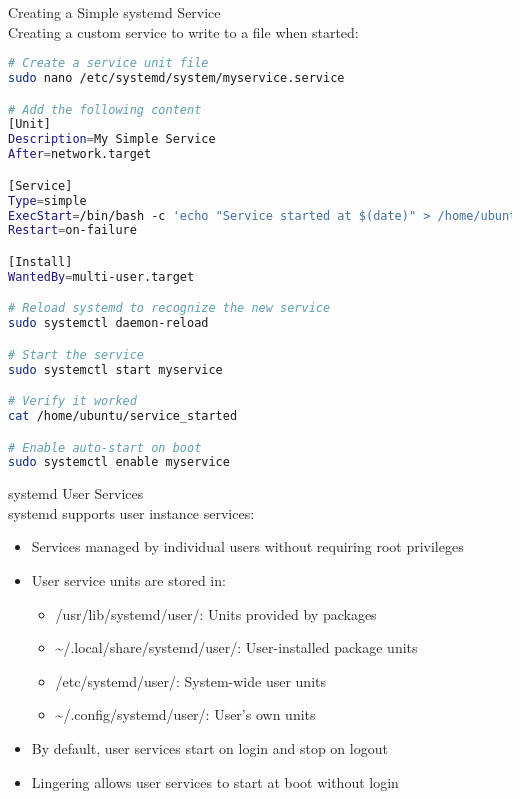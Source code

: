 \begin{example2}{Creating a Simple systemd Service}\\
    Creating a custom service to write to a file when started:
    
\begin{lstlisting}[language=bash, style=basesmol]
# Create a service unit file
sudo nano /etc/systemd/system/myservice.service

# Add the following content
[Unit]
Description=My Simple Service
After=network.target

[Service]
Type=simple
ExecStart=/bin/bash -c 'echo "Service started at $(date)" > /home/ubuntu/service_started'
Restart=on-failure

[Install]
WantedBy=multi-user.target

# Reload systemd to recognize the new service
sudo systemctl daemon-reload

# Start the service
sudo systemctl start myservice

# Verify it worked
cat /home/ubuntu/service_started

# Enable auto-start on boot
sudo systemctl enable myservice
\end{lstlisting}
\end{example2}

\begin{definition}{systemd User Services}\\
    systemd supports user instance services:
    \begin{itemize}
        \item Services managed by individual users without requiring root privileges
        \item User service units are stored in:
            \begin{itemize}
                \item /usr/lib/systemd/user/: Units provided by packages
                \item \textasciitilde/.local/share/systemd/user/: User-installed package units
                \item /etc/systemd/user/: System-wide user units
                \item \textasciitilde/.config/systemd/user/: User's own units
            \end{itemize}
        \item By default, user services start on login and stop on logout
        \item Lingering allows user services to start at boot without login
    \end{itemize}
\end{definition}